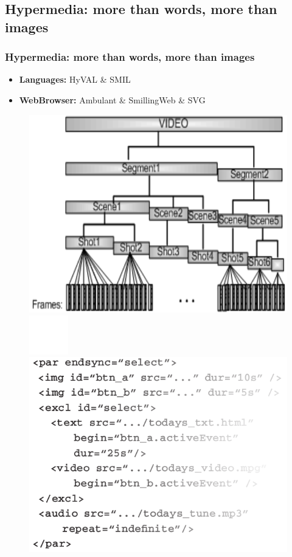 \documentclass[t]{beamer}
\begin{document}
\begin{frame}[c]
\begin{figure}
		\end{figure}
		\end{frame}


	\subsection{Hypermedia: more than words, more than images}
  		\begin{frame}[c]
		\frametitle{Hypermedia: more than words, more than images}
		\begin{itemize}		
		\item \textbf{Languages:} HyVAL \& SMIL
		\vfill
		\item \textbf{WebBrowser:} Ambulant \& SmillingWeb \& SVG
		\end{itemize}
		
			\begin{figure}
			\includegraphics[height=0.4\textheight]{figures/hyval.png}
									\includegraphics[height=0.1\textheight]{figures/space.png}
			\includegraphics[height=0.4\textheight]{figures/smil.png}
		\end{figure}
		\end{frame}
\end{document}

